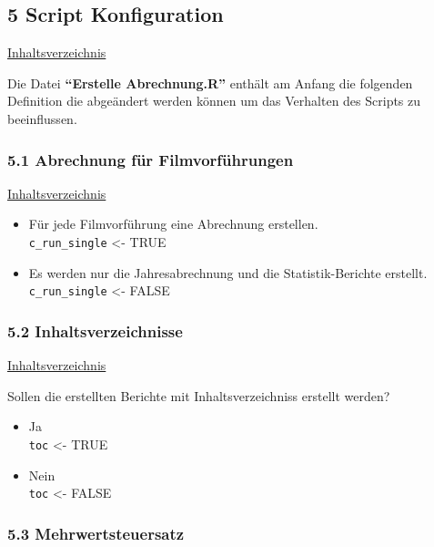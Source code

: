 \documentclass[
]{article}
\providecommand{\tightlist}{%
  \setlength{\itemsep}{0pt}\setlength{\parskip}{0pt}}
\begin{document}
\newpage

\subsection{5 Script Konfiguration}\label{script-konfiguration}

\hyperref[Inhaltsverzeichnis]{Inhaltsverzeichnis}

Die Datei \textbf{``Erstelle Abrechnung.R''} enthält am Anfang die
folgenden Definition die abgeändert werden können um das Verhalten des
Scripts zu beeinflussen.

\subsubsection{5.1 Abrechnung für
Filmvorführungen}\label{abrechnung-fuxfcr-filmvorfuxfchrungen}

\hyperref[Inhaltsverzeichnis]{Inhaltsverzeichnis}

\begin{itemize}
\tightlist
\item
  Für jede Filmvorführung eine Abrechnung erstellen.\\
  \texttt{c\_run\_single} \textless- TRUE
\item
  Es werden nur die Jahresabrechnung und die Statistik-Berichte
  erstellt.\\
  \texttt{c\_run\_single} \textless- FALSE
\end{itemize}

\subsubsection{5.2 Inhaltsverzeichnisse}\label{inhaltsverzeichnisse}

\hyperref[Inhaltsverzeichnis]{Inhaltsverzeichnis}

Sollen die erstellten Berichte mit Inhaltsverzeichniss erstellt werden?

\begin{itemize}
\tightlist
\item
  Ja\\
  \texttt{toc} \textless- TRUE
\item
  Nein\\
  \texttt{toc} \textless- FALSE
\end{itemize}

\subsubsection{5.3 Mehrwertsteuersatz}\label{mehrwertsteuersatz}
\end{document}
